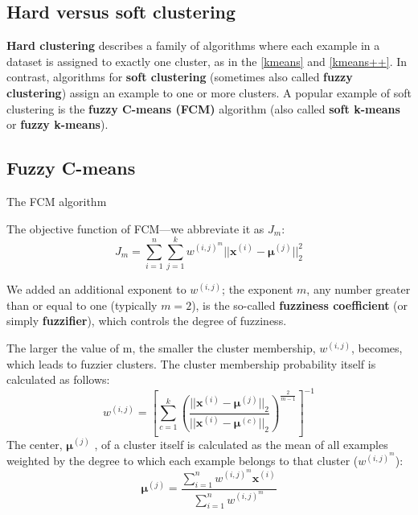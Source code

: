 \subsection{Hard versus soft clustering}
\textbf{Hard clustering} describes a family of algorithms where each example in a dataset is assigned to exactly one cluster, as in the \autoref{kmeans} and \autoref{kmeans++}. In contrast, algorithms for \textbf{soft clustering} (sometimes also called \textbf{fuzzy clustering}) assign an example to one or more clusters. A popular example of soft clustering is the \textbf{fuzzy C-means (FCM)} algorithm (also called \textbf{soft k-means} or \textbf{fuzzy k-means}).
\subsection{Fuzzy C-means}
\begin{algorithm}
    \caption{The FCM algorithm\label{fcm}}
\end{algorithm}

The objective function of FCM—we abbreviate it as $J_m$:
\begin{equation}
    J_m=\sum_{i=1}^{n}\sum_{j=1}^{k}w^{(i,j)^m}||\bm{x}^{(i)}-\bm{\mu}^{(j)}||_2^2
\end{equation}

We added an additional exponent to $w^{(i,j)}$; the exponent $m$, any number greater than or equal to one (typically $m = 2$), is the so-called \textbf{fuzziness coefficient} (or simply \textbf{fuzzifier}), which controls the degree of fuzziness.

The larger the value of m, the smaller the cluster membership, $w^{(i,j)}$, becomes, which leads to fuzzier clusters. The cluster membership probability itself is calculated as follows:
\begin{equation}
    w^{(i,j)}=\left[\sum_{c=1}^{k}\left(\frac{||\bm{x}^{(i)}-\bm{\mu}^{(j)}||_2}{||\bm{x}^{(i)}-\bm{\mu}^{(c)}||_2}\right)^{\frac{2}{m-1}}\right]^{-1}
\end{equation}
The center, $\bm{\mu}^{(j)}$ , of a cluster itself is calculated as the mean of all examples weighted by the degree to
which each example belongs to that cluster ($w^{(i,j)^m}$):
\begin{equation}
    \bm{\mu}^{(j)}=\frac{\sum_{i=1}^{n}w^{(i,j)^m}\bm{x}^{(i)}}{\sum_{i=1}^{n}w^{(i,j)^m}}
\end{equation}